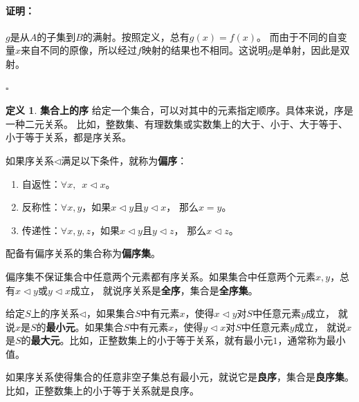 \documentclass[12pt,UTF8]{ctexbook}
\theoremstyle{definition}
\newtheorem{df}{定义}[section]
\theoremstyle{plain}
\renewenvironment{proof}{\paragraph{\textbf{证明：}}}{\hfill$\square$}
\begin{document}
\begin{appendix}
\begin{proof}
    $g$是从$A$的子集到$B$的满射。按照定义，总有$g(x) = f(x)$。
    而由于不同的自变量$x$来自不同的原像，所以经过$f$映射的结果也不相同。这说明$g$是单射，因此是双射。

\end{proof}

\begin{df}{\textbf{集合上的序}}
    给定一个集合，可以对其中的元素指定顺序。具体来说，序是一种二元关系。
    比如，整数集、有理数集或实数集上的大于、小于、大于等于、小于等于关系，都是序关系。

    如果序关系$\triangleleft$满足以下条件，就称为\textbf{偏序}：
    \begin{enumerate}
        \item 自返性：$\forall x, \,\,\, x \triangleleft x$。
        \item 反称性：$\forall x, y$，如果$x \triangleleft y$且$y \triangleleft x$， 那么$x = y$。
        \item 传递性：$\forall x, y, z$，如果$x \triangleleft y$且$y \triangleleft z$， 那么$x \triangleleft z$。
    \end{enumerate}
    配备有偏序关系的集合称为\textbf{偏序集}。

    偏序集不保证集合中任意两个元素都有序关系。如果集合中任意两个元素$x, y$，总有$x \triangleleft y$或$y \triangleleft x$成立，
    就说序关系是\textbf{全序}，集合是\textbf{全序集}。

    给定$S$上的序关系$\triangleleft$，如果集合$S$中有元素$x$，使得$x \triangleleft y$对$S$中任意元素$y$成立，
    就说$x$是$S$的\textbf{最小元}。如果集合$S$中有元素$x$，使得$y \triangleleft x$对$S$中任意元素$y$成立，
    就说$x$是$S$的\textbf{最大元}。比如，正整数集上的小于等于关系，就有最小元$1$，通常称为最小值。
    
    如果序关系使得集合的任意非空子集总有最小元，就说它是\textbf{良序}，集合是\textbf{良序集}。
    比如，正整数集上的小于等于关系就是良序。


\end{df}


\end{appendix}
\end{document}
